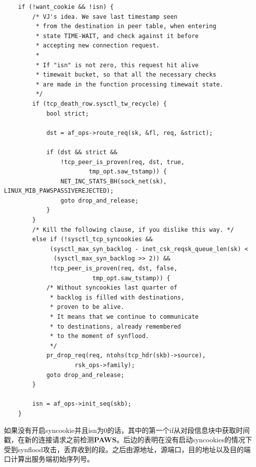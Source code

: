 \begin{verbatim}
    if (!want_cookie && !isn) {
        /* VJ's idea. We save last timestamp seen
         * from the destination in peer table, when entering
         * state TIME-WAIT, and check against it before
         * accepting new connection request.
         *
         * If "isn" is not zero, this request hit alive
         * timewait bucket, so that all the necessary checks
         * are made in the function processing timewait state.
         */
        if (tcp_death_row.sysctl_tw_recycle) {
            bool strict;

            dst = af_ops->route_req(sk, &fl, req, &strict);

            if (dst && strict &&
                !tcp_peer_is_proven(req, dst, true,
                        tmp_opt.saw_tstamp)) {
                NET_INC_STATS_BH(sock_net(sk), LINUX_MIB_PAWSPASSIVEREJECTED);
                goto drop_and_release;
            }
        }
        /* Kill the following clause, if you dislike this way. */
        else if (!sysctl_tcp_syncookies &&
             (sysctl_max_syn_backlog - inet_csk_reqsk_queue_len(sk) <
              (sysctl_max_syn_backlog >> 2)) &&
             !tcp_peer_is_proven(req, dst, false,
                         tmp_opt.saw_tstamp)) {
            /* Without syncookies last quarter of
             * backlog is filled with destinations,
             * proven to be alive.
             * It means that we continue to communicate
             * to destinations, already remembered
             * to the moment of synflood.
             */
            pr_drop_req(req, ntohs(tcp_hdr(skb)->source),
                    rsk_ops->family);
            goto drop_and_release;
        }

        isn = af_ops->init_seq(skb);
    }
\end{verbatim}

        如果没有开启syncookie并且isn为0的话，其中的第一个if从对段信息块中获取时间戳，在新的连接请求之前检测\textbf{PAWS}。后边的表明在没有启动syncookies的情况下受到synflood攻击，丢弃收到的段。之后由源地址，源端口，目的地址以及目的端口计算出服务端初始序列号。


